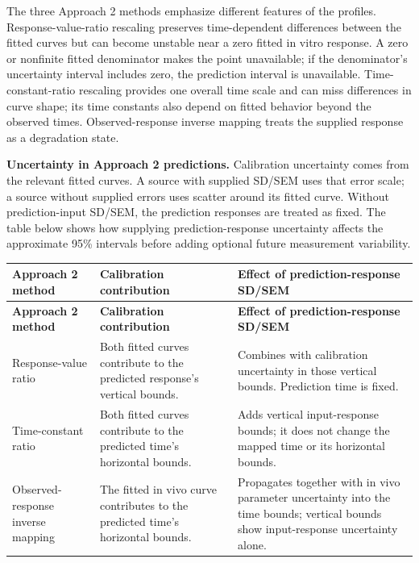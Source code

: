 The three Approach 2 methods emphasize different features of the profiles. Response-value-ratio rescaling preserves time-dependent differences between the fitted curves but can become unstable near a zero fitted in vitro response. A zero or nonfinite fitted denominator makes the point unavailable; if the denominator's uncertainty interval includes zero, the prediction interval is unavailable. Time-constant-ratio rescaling provides one overall time scale and can miss differences in curve shape; its time constants also depend on fitted behavior beyond the observed times. Observed-response inverse mapping treats the supplied response as a degradation state.

\textbf{Uncertainty in Approach 2 predictions.} Calibration uncertainty comes from the relevant fitted curves. A source with supplied SD/SEM uses that error scale; a source without supplied errors uses scatter around its fitted curve. Without prediction-input SD/SEM, the prediction responses are treated as fixed. The table below shows how supplying prediction-response uncertainty affects the approximate 95\% intervals before adding optional future measurement variability.

\begin{longtable}{@{}>{\raggedright\arraybackslash}p{}>{\raggedright\arraybackslash}p{}>{\raggedright\arraybackslash}p{}@{}}
\toprule
\textbf{Approach 2 method} & \textbf{Calibration contribution} & \textbf{Effect of prediction-response SD/SEM} \\
\midrule
\endfirsthead
\toprule
\textbf{Approach 2 method} & \textbf{Calibration contribution} & \textbf{Effect of prediction-response SD/SEM} \\
\midrule
\endhead
Response-value ratio & Both fitted curves contribute to the predicted response's vertical bounds. & Combines with calibration uncertainty in those vertical bounds. Prediction time is fixed. \\
Time-constant ratio & Both fitted curves contribute to the predicted time's horizontal bounds. & Adds vertical input-response bounds; it does not change the mapped time or its horizontal bounds. \\
Observed-response inverse mapping & The fitted in vivo curve contributes to the predicted time's horizontal bounds. & Propagates together with in vivo parameter uncertainty into the time bounds; vertical bounds show input-response uncertainty alone. \\
\bottomrule
\end{longtable}

